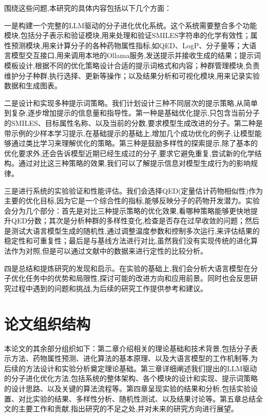 围绕这些问题,本研究的具体内容包括以下几个方面：

一是构建一个完整的LLM驱动的分子进化优化系统。这个系统需要整合多个功能模块,包括分子表示和验证模块,用来处理和验证SMILES字符串的化学有效性；属性预测模块,用来计算分子的各种药物属性指标,如QED、LogP、分子量等；大语言模型交互接口,用来调用本地的Ollama服务,发送提示并接收生成的结果；提示词模板设计,根据不同的优化策略设计合适的提示词格式和内容；种群管理模块,负责维护分子种群,执行选择、更新等操作；以及结果分析和可视化模块,用来记录实验数据和生成图表。

二是设计和实现多种提示词策略。我们计划设计三种不同层次的提示策略,从简单到复杂,逐步增加提示的信息量和指导性。第一种是基础优化提示,只包含当前分子的SMILES、目标属性名称、以及当前的分数,要求模型生成改进的分子。第二种是带示例的少样本学习提示,在基础提示的基础上,增加几个成功优化的例子,让模型能够通过类比学习来理解优化的策略。第三种是鼓励多样性的探索提示,除了基本的优化要求外,还会告诉模型近期已经生成过的分子,要求它避免重复,尝试新的化学结构。通过对比这三种策略的效果,我们可以了解提示信息对模型生成行为的影响规律。

三是进行系统的实验验证和性能评估。我们会选择QED(定量估计药物相似性)作为主要的优化目标,因为它是一个综合性的指标,能够反映分子的药物开发潜力。实验会分为几个部分：首先是对比三种提示策略的优化效果,看哪种策略能够更快地提升QED分数；其次是分析种群的多样性变化,检查是否存在过早收敛的问题；然后是测试大语言模型生成的随机性,通过调整温度参数和控制多次运行,来评估结果的稳定性和可重复性；最后是与基线方法进行对比,虽然我们没有实现传统的进化算法作为对照,但是可以通过文献中的数据来进行定性的比较分析。

四是总结和提炼研究的发现和启示。在实验的基础上,我们会分析大语言模型在分子优化任务中的优势和局限性,探讨可能的改进方向和应用前景。同时也会反思研究过程中遇到的问题和挑战,为后续的研究工作提供参考和建议。

\section{论文组织结构}

本论文的其余部分组织如下：第二章介绍相关的理论基础和技术背景,包括分子表示方法、药物属性预测、进化算法的基本原理、以及大语言模型的工作机制等,为后续的方法设计和实验分析奠定理论基础。第三章详细阐述我们提出的LLM驱动的分子进化优化方法,包括系统的整体架构、各个模块的设计和实现、提示词策略的设计思路、以及关键的算法流程等。第四章呈现实验的结果和分析,包括实验设置、对比实验的结果、多样性分析、随机性测试、以及结果讨论等。第五章总结全文的主要工作和贡献,指出研究的不足之处,并对未来的研究方向进行展望。
